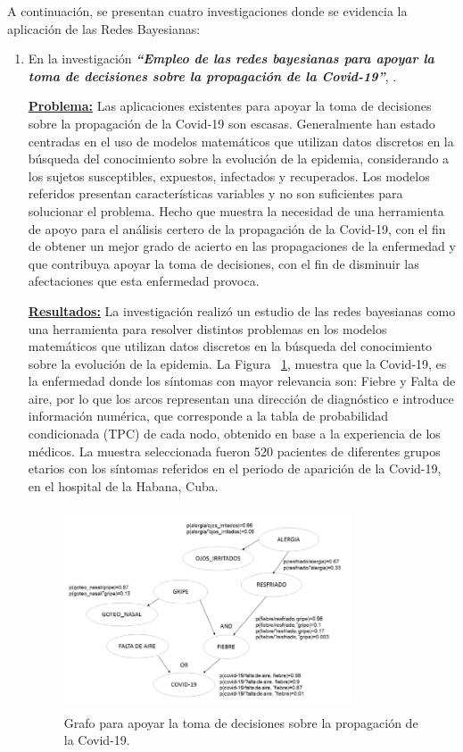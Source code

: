 \documentclass[10pt,conference]{IEEEtran}
\begin{document}
A continuación, se presentan cuatro investigaciones donde se evidencia la aplicación de las Redes Bayesianas:
\begin{enumerate}
\item En la investigación \textit{\textbf{“Empleo de las redes bayesianas para apoyar la toma de decisiones sobre la propagación de la Covid-19”}}, \citep{cordero2021empleo}.

\textbf{\underline{Problema:}} Las aplicaciones existentes para apoyar la toma de decisiones sobre la propagación de la Covid-19 son escasas. Generalmente han estado centradas en el uso de modelos matemáticos que utilizan datos discretos en la búsqueda del conocimiento sobre la evolución de la epidemia, considerando a los sujetos susceptibles, expuestos, infectados y recuperados. Los modelos referidos presentan características variables y no son suficientes para solucionar el problema. Hecho que muestra la necesidad de una herramienta de apoyo para el análisis certero de la propagación de la Covid-19, con el fin de obtener un mejor grado de acierto en las propagaciones de la enfermedad y que contribuya apoyar la toma de decisiones, con el fin de disminuir las afectaciones que esta enfermedad provoca.

\textbf{\underline{Resultados:}} La investigación realizó un estudio de las redes bayesianas como una herramienta para resolver distintos problemas en los modelos matemáticos que utilizan datos discretos en la búsqueda del conocimiento sobre la evolución de la epidemia. La Figura ~\ref{RB1}, muestra que la Covid-19, es la enfermedad donde los síntomas con mayor relevancia son: Fiebre y Falta de aire, por lo que los arcos representan una dirección de diagnóstico e introduce información numérica, que corresponde a la tabla de probabilidad condicionada (TPC) de cada nodo, obtenido en base a la experiencia de los médicos. La muestra seleccionada fueron 520 pacientes de diferentes grupos etarios con los síntomas referidos en el periodo de aparición de la Covid-19, en el hospital de la Habana, Cuba.

\begin{figure}[H]
\begin{center}
\includegraphics[width=8.5cm, height=6cm]{figuras/RB1.PNG}
\caption{Grafo para apoyar la toma de decisiones sobre la propagación de la Covid-19.}
\label{RB1} 
\end{center}
\end{figure}


\end{enumerate}
\end{document}
